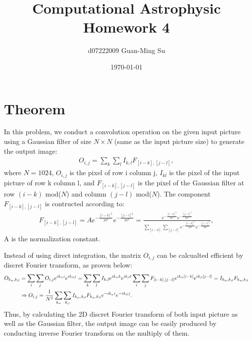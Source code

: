\documentclass[a4paper,10pt]{article}
\title{Computational Astrophysic\\Homework 4}
\author{d07222009 Guan-Ming Su}
\date{\today}       %
\begin{document}
\maketitle

\section*{Theorem}
\begin{large}
In this problem, we conduct a convolution operation on the given input picture using a Gaussian filter of size $N\times N$  (same as the input picture size) to generate the output image:
\begin{align*}
O_{i,j}=\sum_k\sum_lI_{k,l}F_{[i-k],[j-l]},
\end{align*}
where $N=1024$, $O_{i,j}$ is the pixel of row i column j, $I_{kl}$ is the pixel of the input picture of row k column l, and $F_{[i-k],[j-l]}$ is the pixel of the Gaussian filter at row $(i-k)$ mod($N$) and column $(j-l)$ mod($N$). The component $F_{[i-k],[j-l]}$ is contructed according to:
\begin{align*}
F_{[i-k],[j-l]} = Ae^{-\frac{[i-k]^2}{2\sigma^2}}e^{-\frac{[j-l]^2}{2\sigma^2}}=\frac{e^{-\frac{[i-k]^2}{2\sigma^2}}e^{-\frac{[j-l]^2}{2\sigma^2}}}{\sum_{[i-k]}\sum_{[j-l]}e^{-\frac{[i-k]^2}{2\sigma^2}}e^{-\frac{[j-l]^2}{2\sigma^2}}},
\end{align*}
A is the normalization constant.


Instead of using direct integration, the matrix $O_{i,j}$ can be calcualted efficient by discret Fourier transform, as proven below:
\begin{align}\notag
O_{k_\alpha,k_\beta}&=\sum_{i}\sum_{j}O_{i,j}e^{ik_\alpha i}e^{ik_\beta j} = \sum_k\sum_lI_{k,l}e^{ik_\alpha k}e^{ik_\beta l}\sum_i\sum_jF_{[i-k],[j-l]}e^{ik_\alpha [i-k]}e^{ik_\beta [j-l]}=I_{k_\alpha,k_\beta}F_{k_\alpha,k_\beta}\\
&\Rightarrow O_{i,j}=\frac{1}{N^2}\sum_{k_\alpha}\sum_{k_\beta} I_{k_\alpha,k_\beta}F_{k_\alpha,k_\beta}e^{-ik_\alpha i}e^{-ik_\beta j}.
\end{align}
Thus, by calculating the 2D discret Fourier transform of both input picture as well as the Gaussian filter, the output image can be easily produced by conducting inverse Fourier transform on the multiply of them.
\end{large}
\end{document}
